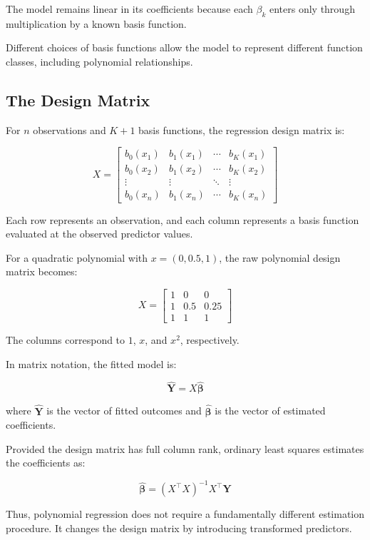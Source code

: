 \documentclass[
  letterpaper,
  DIV=11,
  numbers=noendperiod]{scrreprt}
\begin{document}
The model remains linear in its coefficients because each \(\beta_k\)
enters only through multiplication by a known basis function.

Different choices of basis functions allow the model to represent
different function classes, including polynomial relationships.

\subsection{The Design Matrix}\label{the-design-matrix}

For \(n\) observations and \(K+1\) basis functions, the regression
design matrix is:

\[
X =
\begin{bmatrix}
b_0(x_1) & b_1(x_1) & \cdots & b_K(x_1) \\
b_0(x_2) & b_1(x_2) & \cdots & b_K(x_2) \\
\vdots & \vdots & \ddots & \vdots \\
b_0(x_n) & b_1(x_n) & \cdots & b_K(x_n)
\end{bmatrix}
\]

Each row represents an observation, and each column represents a basis
function evaluated at the observed predictor values.

For a quadratic polynomial with \(x = (0, 0.5, 1)\), the raw polynomial
design matrix becomes:

\[
X =
\begin{bmatrix}
1 & 0 & 0 \\
1 & 0.5 & 0.25 \\
1 & 1 & 1
\end{bmatrix}
\]

The columns correspond to \(1\), \(x\), and \(x^2\), respectively.

In matrix notation, the fitted model is:

\[
\hat{\mathbf{Y}} = X\hat{\boldsymbol{\beta}}
\]

where \(\hat{\mathbf{Y}}\) is the vector of fitted outcomes and
\(\hat{\boldsymbol{\beta}}\) is the vector of estimated coefficients.

Provided the design matrix has full column rank, ordinary least squares
estimates the coefficients as:

\[
\hat{\boldsymbol{\beta}}
=
(X^\top X)^{-1}X^\top\mathbf{Y}
\]

Thus, polynomial regression does not require a fundamentally different
estimation procedure. It changes the design matrix by introducing
transformed predictors.
\end{document}
